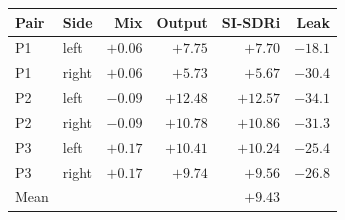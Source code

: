 \begin{tabular}{@{}llrrrr@{}}
\toprule
Pair & Side & Mix & Output & SI-SDRi & Leak \\
\midrule
P1 & left & $+0.06$ & $+7.75$ & $+7.70$ & $-18.1$ \\
P1 & right & $+0.06$ & $+5.73$ & $+5.67$ & $-30.4$ \\
P2 & left & $-0.09$ & $+12.48$ & $+12.57$ & $-34.1$ \\
P2 & right & $-0.09$ & $+10.78$ & $+10.86$ & $-31.3$ \\
P3 & left & $+0.17$ & $+10.41$ & $+10.24$ & $-25.4$ \\
P3 & right & $+0.17$ & $+9.74$ & $+9.56$ & $-26.8$ \\
\midrule
Mean & & & & $\mathbf{+9.43}$ & \\
\bottomrule
\end{tabular}
